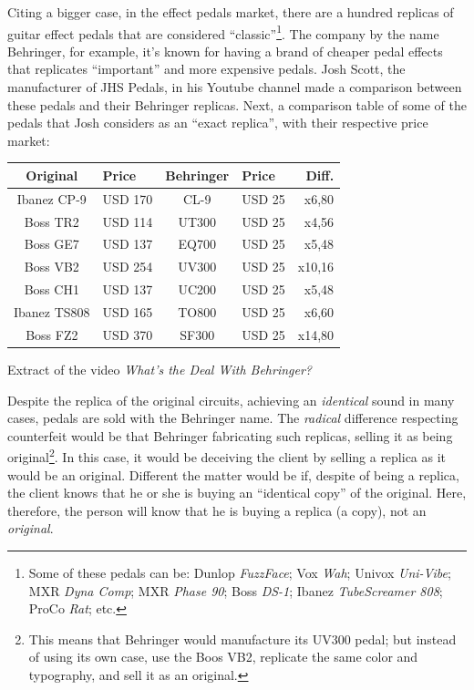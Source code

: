 \documentclass[12pt,a4paper]{article}
\begin{document}
Citing a bigger case, in the effect pedals market, there are a hundred replicas of guitar effect pedals that are considered “classic”\footnote{Some of these pedals can be: Dunlop \textit{FuzzFace}; Vox \textit{Wah}; Univox \textit{Uni-Vibe}; MXR \textit{Dyna Comp}; MXR \textit{Phase 90}; Boss \textit{DS-1}; Ibanez \textit{TubeScreamer 808}; ProCo \textit{Rat}; etc.}. The company by the name Behringer, for example, it's known for having a brand of cheaper pedal effects that replicates “important” and more expensive pedals. Josh Scott, the manufacturer of JHS Pedals, in his Youtube channel made a comparison between these pedals and their Behringer replicas. Next, a comparison table of some of the pedals that Josh considers as an “exact replica”, with their respective price market:

\begin{center}
\begin{tabular}{|c|l|c|l|r|}
\hline 
\textbf{Original} & \textbf{Price} & \textbf{Behringer} & \textbf{Price} & \textbf{Diff.} \\ 
\hline 
Ibanez CP-9 & USD 170 & CL-9 & USD 25 & x6,80 \\ 
\hline 
Boss TR2 & USD 114 & UT300 & USD 25 & x4,56 \\ 
\hline 
Boss GE7 & USD 137 & EQ700 & USD 25 & x5,48 \\ 
\hline 
Boss VB2 & USD 254 & UV300 & USD 25 & x10,16 \\ 
\hline 
Boss CH1 & USD 137 & UC200 & USD 25 & x5,48 \\ 
\hline 
Ibanez TS808 & USD 165 & TO800 & USD 25 & x6,60 \\ 
\hline 
Boss FZ2 & USD 370 & SF300 & USD 25 & x14,80 \\ 
\hline 
\end{tabular}
\end{center}

\begin{footnotesize}
\begin{flushright}
Extract of the video \textit{What's the Deal With Behringer?} \cite{pedals}
\end{flushright}
\end{footnotesize}

Despite the replica of the original circuits, achieving an \textit{identical} sound in many cases, pedals are sold with the Behringer name. The \textit{radical} difference respecting counterfeit would be that Behringer fabricating such replicas, selling it as being original\footnote{This means that Behringer would manufacture its UV300 pedal; but instead of using its own case, use the Boos VB2, replicate the same color and typography, and sell it as an original.}. In this case, it would be deceiving the client by selling a replica as it would be an original. Different the matter would be if, despite of being a replica, the client knows that he or she is buying an “identical copy” of the original. Here, therefore, the person will know that he is buying a replica (a copy), not an \textit{original}.
\end{document}
